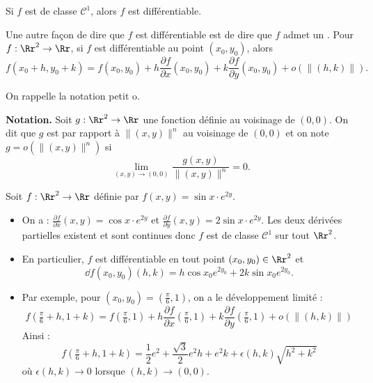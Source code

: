 \documentclass[11pt, class=report,crop=false]{standalone}
\begin{document}
\begin{theoreme}
\label{th:foncc1}
Si $f$ est de classe $\mathcal{C}^1$, alors $f$ est différentiable.
\end{theoreme}

Une autre façon de dire que $f$ est différentiable est de dire que $f$ admet un . Pour $f : \Rr^2 \to \Rr$, si $f$ est différentiable au point $(x_0,y_0)$, alors
$$f(x_0+h,y_0+k)=f(x_0,y_0)+h\frac{\partial f}{\partial x}(x_0,y_0)+k\frac{\partial f}{\partial y}(x_0,y_0)+o\left(\|(h,k)\|\right).$$

\bigskip

On rappelle la notation \og{}petit o\fg{}.

\textbf{Notation.} Soit $g :\Rr^2\to \Rr$ une fonction définie au voisinage de $(0,0)$. On dit que $g$ est  par rapport à $\|(x,y)\|^n$ au voisinage de $(0,0)$ et on note $g=o\left(\|(x,y)\|^n\right)$ si 
$$\lim_{(x,y)\to(0,0)}\frac{g(x,y)}{\|(x,y)\|^n}=0.$$

\begin{exemple}
Soit $f : \Rr^2 \to \Rr$ définie par $f(x,y)=\sin x \cdot e ^{2y}$.

\begin{itemize}
  \item On a : $\frac{\partial f}{\partial x}(x,y)=\cos x \cdot e ^{2y}$ et $\frac{\partial f}{\partial y}(x,y)=2\sin x \cdot e ^{2y}$. Les deux dérivées partielles existent et sont continues donc $f$ est de classe $\mathcal{C}^1$ sur tout $\Rr^2$. 
  
  \item En particulier, $f$ est différentiable en tout point $(x_0,y_0) \in \Rr^2$ et 
  $$\dd f (x_0,y_0)(h,k) = h\cos x_0 e ^{2y_0}+2k\sin x_0 e ^{2y_0}.$$
  
  \item Par exemple, pour $(x_0,y_0) = (\frac\pi6,1)$, on a le développement limité :
  $$f(\tfrac\pi6+h,1+k) = f(\tfrac\pi6,1) + 
  h\frac{\partial f}{\partial x}(\tfrac\pi6,1)+
  k \frac{\partial f}{\partial y}(\tfrac\pi6,1) + o\left(\|(h,k)\|\right)$$
  Ainsi :
 $$f(\tfrac\pi6+h,1+k) = \frac{1}{2}e^2 + \frac{\sqrt3}{2}e^2h + 
 e^2k + \epsilon(h,k)\sqrt{h^2+k^2}$$
 où $\epsilon(h,k) \to 0$ lorsque $(h,k) \to (0,0)$. 
\end{itemize}

\end{exemple}
\end{document}
